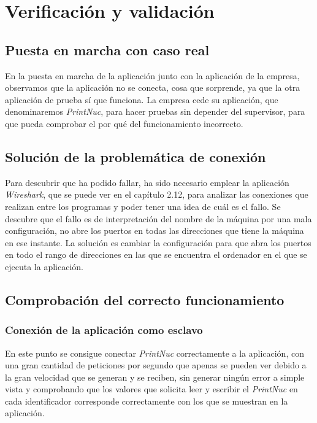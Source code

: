 \documentclass[pdftex,11pt,a4paper]{book}
\begin{document}
\section{Verificación y validación}

\subsection{Puesta en marcha con caso real}

En la puesta en marcha de la aplicación junto con la aplicación de la empresa, observamos que la aplicación no se conecta, cosa que sorprende, ya que la otra aplicación de prueba sí que funciona. La empresa cede su aplicación, que denominaremos \emph{PrintNuc}, para hacer pruebas sin depender del supervisor, para que pueda comprobar el por qué del funcionamiento incorrecto.

\subsection{Solución de la problemática de conexión}

Para descubrir que ha podido fallar, ha sido necesario emplear la aplicación \emph{Wireshark}, que se puede ver en el capítulo 2.12, para analizar las conexiones que realizan entre los programas y poder tener una idea de cuál es el fallo. Se descubre que el fallo es de interpretación del nombre de la máquina por una mala configuración, no abre los puertos en todas las direcciones que tiene la máquina en ese instante. La solución es cambiar la configuración para que abra los puertos en todo el rango de direcciones en las que se encuentra el ordenador en el que se ejecuta la aplicación.

\subsection{Comprobación del correcto funcionamiento}

\subsubsection{Conexión de la aplicación como esclavo}
En este punto se consigue conectar \emph{PrintNuc} correctamente a la aplicación, con una gran cantidad de peticiones por segundo que apenas se pueden ver debido a la gran velocidad que se generan y se reciben, sin generar ningún error a simple vista y comprobando que los valores que solicita leer y escribir el \emph{PrintNuc} en cada identificador corresponde correctamente con los que se muestran en la aplicación.
\end{document}
